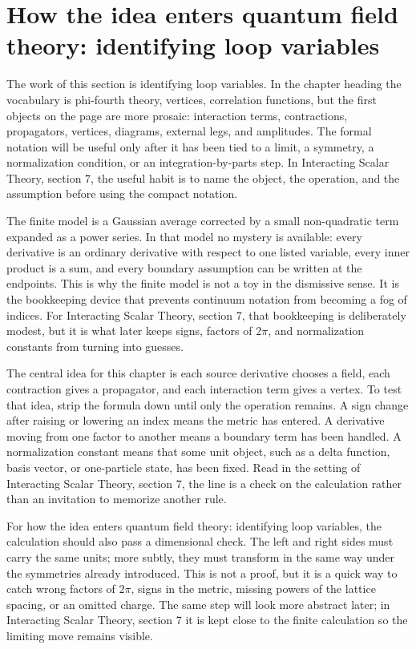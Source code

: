 \section{How the idea enters quantum field theory: identifying loop variables}

The work of this section is identifying loop variables.  In the chapter heading the vocabulary is phi-fourth theory, vertices, correlation functions, but the first objects on the page are more prosaic: interaction terms, contractions, propagators, vertices, diagrams, external legs, and amplitudes.  The formal notation will be useful only after it has been tied to a limit, a symmetry, a normalization condition, or an integration-by-parts step.  In Interacting Scalar Theory, section 7, the useful habit is to name the object, the operation, and the assumption before using the compact notation.

The finite model is a Gaussian average corrected by a small non-quadratic term expanded as a power series.  In that model no mystery is available: every derivative is an ordinary derivative with respect to one listed variable, every inner product is a sum, and every boundary assumption can be written at the endpoints.  This is why the finite model is not a toy in the dismissive sense.  It is the bookkeeping device that prevents continuum notation from becoming a fog of indices.  For Interacting Scalar Theory, section 7, that bookkeeping is deliberately modest, but it is what later keeps signs, factors of \(2\pi\), and normalization constants from turning into guesses.

The central idea for this chapter is each source derivative chooses a field, each contraction gives a propagator, and each interaction term gives a vertex.  To test that idea, strip the formula down until only the operation remains.  A sign change after raising or lowering an index means the metric has entered.  A derivative moving from one factor to another means a boundary term has been handled.  A normalization constant means that some unit object, such as a delta function, basis vector, or one-particle state, has been fixed.  Read in the setting of Interacting Scalar Theory, section 7, the line is a check on the calculation rather than an invitation to memorize another rule.

For how the idea enters quantum field theory: identifying loop variables, the calculation should also pass a dimensional check.  The left and right sides must carry the same units; more subtly, they must transform in the same way under the symmetries already introduced.  This is not a proof, but it is a quick way to catch wrong factors of \(2\pi\), signs in the metric, missing powers of the lattice spacing, or an omitted charge.  The same step will look more abstract later; in Interacting Scalar Theory, section 7 it is kept close to the finite calculation so the limiting move remains visible.

